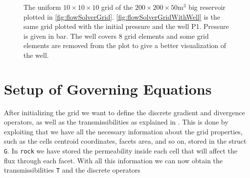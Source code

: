 \begin{figure}[H]
\begin{subfigure}[t]{0.48\textwidth}
        \caption{}
        \label{fig:flowSolverGridWithWell}
    \end{subfigure}
    \caption{The uniform $10\times 10 \times 10$ grid of the $200\times 200 \times 50 \text{m}^3$ big reservoir plotted in \autoref{fig:flowSolverGrid}. \autoref{fig:flowSolverGridWithWell} is the same grid plotted with the initial pressure and the well P1. Pressure is given in bar. The well covers 8 grid elements and some grid elements are removed from the plot to give a better visualization of the well.}
\end{figure}

\section{Setup of Governing Equations}
\label{sec:setupGovEq}
After initializing the grid we want to define the discrete gradient and divergence operators, as well as the transmissibilities as explained in . This is done by exploiting that we have all the necessary information about the grid properties, such as the cells centroid coordinates, facets area, and so on, stored in the struct \texttt{G}. In \texttt{rock} we have stored the permeability inside each cell that will affect the flux through each facet. With all this information we can now obtain the transmissibilities \texttt{T} and the discrete operators


